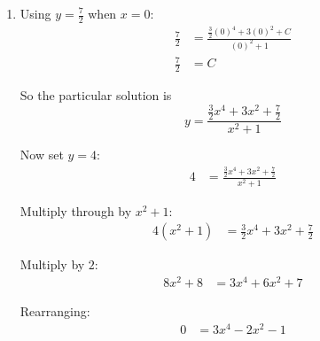 \documentclass[leqno]{article}
\begin{document}
\begin{enumerate}[
  label=\textbf{\arabic*.},
  leftmargin=*,
  topsep=0pt,
  partopsep=0pt,
  parsep=0pt
]
\begin{tcolorbox}[colback=white, colframe=scarlet, title={\textbf{Solution}}, breakable, grow to left by=6mm, grow to right by=10mm]
\begin{enumerate}[label=\textbf{(\alph*)}]
  Its integrating factor is
  \begin{align*}
  \mu(x)&=e^{\int \frac{2x}{x^2+1}\,\,\mathrm{d}x} \\
  &=e^{\ln(x^2+1)} \\
  &=x^2+1
  \end{align*}

  Multiplying the differential equation by $x^2+1$ gives
  \begin{align*}
  (x^2+1)\frac{\mathrm{d}y}{\mathrm{d}x}+2xy&=6x(x^2+1)
  \end{align*}

  The left-hand side is the derivative of $(x^2+1)y$, so
  \[
  \frac{\mathrm{d}}{\mathrm{d}x}\bigl((x^2+1)y\bigr)=6x(x^2+1)
  \]

  Integrating both sides:
  \begin{align*}
  (x^2+1)y&=\int 6x(x^2+1)\,\,\mathrm{d}x \\
  &=\int (6x^3+6x)\,\,\mathrm{d}x \\
  &=\frac{3}{2}x^4+3x^2+C
  \end{align*}

  Hence
  \[
  y=\frac{\frac{3}{2}x^4+3x^2+C}{x^2+1}
  \]

  Therefore, the general solution is
  \[
  y=\frac{\frac{3}{2}x^4+3x^2+C}{x^2+1}
  \]

  \item Using $y=\tfrac{7}{2}$ when $x=0$:
  \begin{align*}
  \frac{7}{2}&=\frac{\frac{3}{2}(0)^4+3(0)^2+C}{(0)^2+1} \\
  \frac{7}{2}&=C
  \end{align*}

  So the particular solution is
  \[
  y=\frac{\frac{3}{2}x^4+3x^2+\frac{7}{2}}{x^2+1}
  \]

  Now set $y=4$:
  \begin{align*}
  4&=\frac{\frac{3}{2}x^4+3x^2+\frac{7}{2}}{x^2+1}
  \end{align*}

  Multiply through by $x^2+1$:
  \begin{align*}
  4(x^2+1)&=\frac{3}{2}x^4+3x^2+\frac{7}{2}
  \end{align*}

  Multiply by $2$:
  \begin{align*}
  8x^2+8&=3x^4+6x^2+7
  \end{align*}

  Rearranging:
  \begin{align*}
  0&=3x^4-2x^2-1
  \end{align*}


\end{enumerate}
\end{tcolorbox}
\end{enumerate}
\end{document}
